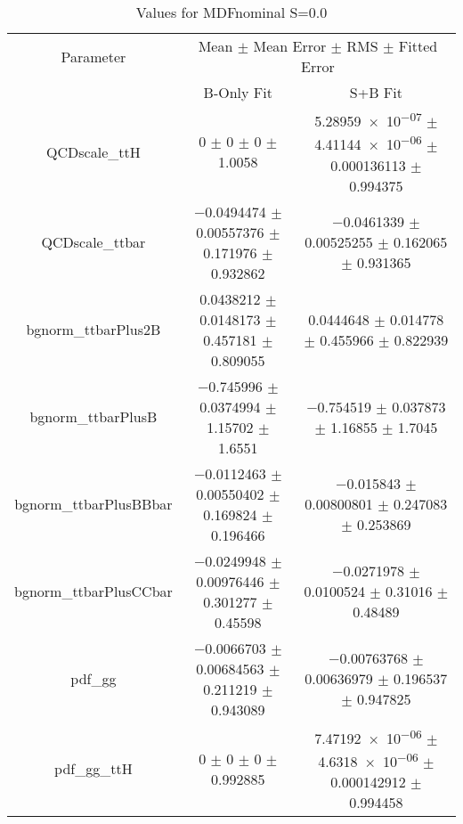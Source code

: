 \begin{table}
\centering
\caption{Values for MDFnominal S=0.0}
\begin{tabular}{ccc}
\toprule
Parameter & \multicolumn{2}{c}{Mean $\pm$ Mean Error $\pm$ RMS $\pm$ Fitted Error}\\
 & B-Only Fit & S+B Fit\\
\midrule
QCDscale\_ttH & \num{0} $\pm$ \num{0} $\pm$ \num{0} $\pm$ \num{1.0058} & \num{5.28959e-07} $\pm$ \num{4.41144e-06} $\pm$ \num{0.000136113} $\pm$ \num{0.994375}\\
QCDscale\_ttbar & \num{-0.0494474} $\pm$ \num{0.00557376} $\pm$ \num{0.171976} $\pm$ \num{0.932862} & \num{-0.0461339} $\pm$ \num{0.00525255} $\pm$ \num{0.162065} $\pm$ \num{0.931365}\\
bgnorm\_ttbarPlus2B & \num{0.0438212} $\pm$ \num{0.0148173} $\pm$ \num{0.457181} $\pm$ \num{0.809055} & \num{0.0444648} $\pm$ \num{0.014778} $\pm$ \num{0.455966} $\pm$ \num{0.822939}\\
bgnorm\_ttbarPlusB & \num{-0.745996} $\pm$ \num{0.0374994} $\pm$ \num{1.15702} $\pm$ \num{1.6551} & \num{-0.754519} $\pm$ \num{0.037873} $\pm$ \num{1.16855} $\pm$ \num{1.7045}\\
bgnorm\_ttbarPlusBBbar & \num{-0.0112463} $\pm$ \num{0.00550402} $\pm$ \num{0.169824} $\pm$ \num{0.196466} & \num{-0.015843} $\pm$ \num{0.00800801} $\pm$ \num{0.247083} $\pm$ \num{0.253869}\\
bgnorm\_ttbarPlusCCbar & \num{-0.0249948} $\pm$ \num{0.00976446} $\pm$ \num{0.301277} $\pm$ \num{0.45598} & \num{-0.0271978} $\pm$ \num{0.0100524} $\pm$ \num{0.31016} $\pm$ \num{0.48489}\\
pdf\_gg & \num{-0.0066703} $\pm$ \num{0.00684563} $\pm$ \num{0.211219} $\pm$ \num{0.943089} & \num{-0.00763768} $\pm$ \num{0.00636979} $\pm$ \num{0.196537} $\pm$ \num{0.947825}\\
pdf\_gg\_ttH & \num{0} $\pm$ \num{0} $\pm$ \num{0} $\pm$ \num{0.992885} & \num{7.47192e-06} $\pm$ \num{4.6318e-06} $\pm$ \num{0.000142912} $\pm$ \num{0.994458}\\
\bottomrule
\end{tabular}
\end{table}